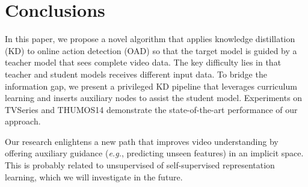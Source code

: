 \documentclass[final]{cvpr}
\begin{document}
\section{Conclusions}

In this paper, we propose a novel algorithm that applies knowledge distillation (KD) to online action detection (OAD) so that the target model is guided by a teacher model that sees complete video data. The key difficulty lies in that teacher and student models receives different input data. To bridge the information gap, we present a privileged KD pipeline that leverages curriculum learning and inserts auxiliary nodes to assist the student model. Experiments on TVSeries and THUMOS14 demonstrate the state-of-the-art performance of our approach.

Our research enlightens a new path that improves video understanding by offering auxiliary guidance (\textit{e.g.}, predicting unseen features) in an implicit space. This is probably related to unsupervised of self-supervised representation learning, which we will investigate in the future.


{\small


}
\end{document}
